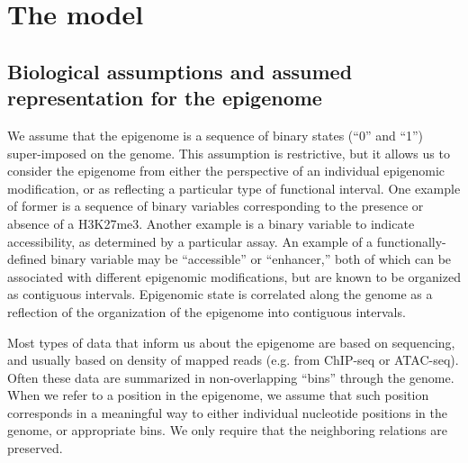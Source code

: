 \documentclass[11pt]{article}
\begin{document}
\section{The model}

\subsection{Biological assumptions and assumed representation for the epigenome}
\label{biodefs}

We assume that the epigenome is a sequence of binary states (``0'' and ``1'')
super-imposed on the genome. This assumption is restrictive, but it
allows us to consider the epigenome from either the perspective of an
individual epigenomic modification, or as reflecting a particular type
of functional interval. One example of former is a sequence of binary
variables corresponding to the presence or absence of a H3K27me3.
Another example is a binary variable to indicate accessibility, as
determined by a particular assay. An example of a functionally-defined
binary variable may be ``accessible'' or ``enhancer,'' both of which
can be associated with different epigenomic modifications, but are
known to be organized as contiguous intervals. Epigenomic state is
correlated along the genome as a reflection of the organization of the
epigenome into contiguous intervals.

Most types of data that inform us about the epigenome are based on
sequencing, and usually based on density of mapped reads (e.g. from
ChIP-seq or ATAC-seq). Often these data are summarized in
non-overlapping ``bins'' through the genome. When we refer to a
position in the epigenome, we assume that such position corresponds in
a meaningful way to either individual nucleotide positions
in the genome, or appropriate bins. We only require that the
neighboring relations are preserved.

\end{document}
